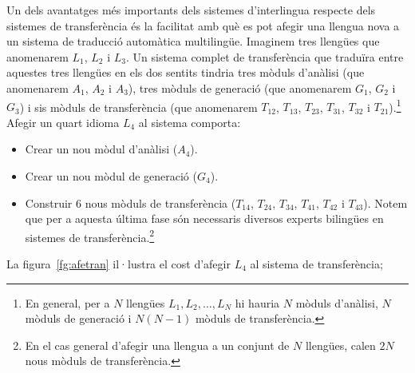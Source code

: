 Un dels avantatges més importants dels sistemes d'interlingua respecte
dels sistemes de transferència és la facilitat amb què es pot afegir
una llengua nova a un sistema de traducció automàtica multilingüe.
Imaginem tres llengües que anomenarem $L_1$, $L_2$ i $L_3$. Un sistema
complet de transferència que traduïra entre aquestes tres llengües en
els dos sentits tindria tres mòduls d'anàlisi (que anomenarem $A_1$,
$A_2$ i $A_3$), tres mòduls de generació (que anomenarem $G_1$, $G_2$
i $G_3$) i sis mòduls de transferència (que anomenarem $T_{12}$,
$T_{13}$, $T_{23}$, $T_{31}$, $T_{32}$ i $T_{21}$).\footnote{En
  general, per a $N$ llengües $L_1, L_2, \ldots, L_N$ hi hauria $N$
  mòduls d'anàlisi, $N$ mòduls de generació i $N(N-1)$ mòduls de
  transferència.} Afegir un quart idioma $L_4$ al sistema comporta:
\begin{itemize}
\item Crear un nou mòdul d'anàlisi ($A_4$).
\item Crear un nou mòdul de generació ($G_4$).
\item Construir 6 nous mòduls de transferència ($T_{14}$, $T_{24}$,
  $T_{34}$, $T_{41}$, $T_{42}$ i $T_{43}$). Notem que per a aquesta
  última fase són necessaris diversos experts bilingües en sistemes de
  transferència.\footnote{En el cas general d'afegir una llengua a un
    conjunt de $N$ llengües, calen $2N$ nous mòduls de transferència.}
\end{itemize}
La figura~\ref{fg:afetran} il·lustra el cost d'afegir $L_4$ al sistema
de transferència;
